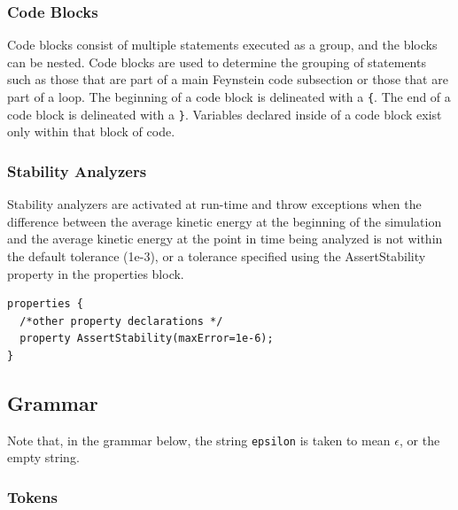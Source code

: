 \subsubsection{Code Blocks}
Code blocks consist of multiple statements executed as a group, and
the blocks can be nested. Code blocks are used to determine the
grouping of statements such as those that are part of a main Feynstein
code subsection or those that are part of a loop. The beginning of a code
block is delineated with a \texttt{\{}. The end of a code block is delineated
with a \texttt{\}}. Variables declared inside of a code block exist only
within that block of code.

\subsubsection{Stability Analyzers}

Stability analyzers are activated at run-time and throw exceptions
when the difference between the average kinetic energy at the
beginning of the simulation and the average kinetic energy at the
point in time being analyzed is not within the default tolerance
(1e-3), or a tolerance specified using the AssertStability property in
the properties block.

\begin{verbatim}
properties {
  /*other property declarations */
  property AssertStability(maxError=1e-6);
}
\end{verbatim}

\subsection{Grammar}

Note that, in the grammar below, the string \texttt{epsilon} is taken
to mean $\epsilon$, or the empty string.

\subsubsection{Tokens}

